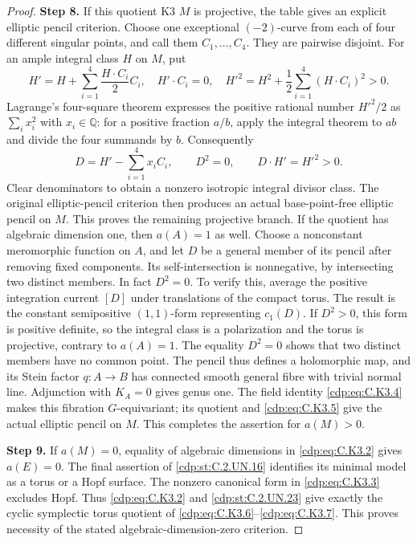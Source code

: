 \begin{proof}
\noindent\textbf{Step 8.} If this quotient K3 $M$ is projective, the table gives
an explicit elliptic pencil criterion. Choose one
exceptional $(-2)$-curve from each of four different
singular points, and call them $C_1,\ldots,C_4$.
They are pairwise disjoint. For an ample integral
class $H$ on $M$, put
\[
 H'=H+\sum_{i=1}^4\frac{H\cdot C_i}{2}C_i,
 \quad H'\cdot C_i=0,
 \quad H'^2=H^2+\frac12\sum_{i=1}^4(H\cdot C_i)^2>0.
                                                               \tag{C.K3.8}\label{cdp:eq:C.K3.8}
\]
Lagrange's four-square theorem
\cite[Theorem~II, Corollary~II]{Lagrange1770}
expresses the positive rational number $H'^2/2$ as
$\sum_i x_i^2$ with $x_i\in\mathbb Q$: for a
positive fraction $a/b$, apply the integral theorem
to $ab$ and divide the four summands by $b$.
Consequently
\[
 D=H'-\sum_{i=1}^4x_iC_i,
 \qquad D^2=0,
 \qquad D\cdot H'=H'^2>0.
                                                               \tag{C.K3.9}\label{cdp:eq:C.K3.9}
\]
Clear denominators to obtain a nonzero isotropic
integral divisor class. The original elliptic-pencil
criterion \cite[\S3, Corollary~3, with the reflection
argument of \S6]{PiatetskiShapiroShafarevich1971}
then produces an actual base-point-free elliptic
pencil on $M$. This proves the remaining projective
branch. If the quotient has algebraic dimension
one, then $a(A)=1$ as well. Choose a nonconstant
meromorphic function on $A$, and let $D$ be a
general member of its pencil after removing fixed
components. Its self-intersection is nonnegative,
by intersecting two distinct members. In fact
$D^2=0$. To verify this, average the positive
integration current $[D]$ under translations of
the compact torus. The result is the constant
semipositive $(1,1)$-form representing $c_1(D)$.
If $D^2>0$, this form is positive definite, so
the integral class is a polarization and the
torus is projective, contrary to $a(A)=1$.
The equality $D^2=0$ shows that two distinct
members have no common point. The pencil thus
defines a holomorphic map, and its Stein factor
$q:A\to B$ has connected smooth general fibre
with trivial normal line. Adjunction with
$K_A=0$ gives genus one. The field identity
\eqref{cdp:eq:C.K3.4} makes this fibration $G$-equivariant;
its quotient and \eqref{cdp:eq:C.K3.5} give the actual
elliptic pencil on $M$. This completes the
assertion for $a(M)>0$.

\noindent\textbf{Step 9.} If $a(M)=0$, equality of algebraic dimensions in
\eqref{cdp:eq:C.K3.2} gives $a(E)=0$. The final assertion of
\ref{cdp:st:C.2.UN.16} identifies its minimal model as a torus
or a Hopf surface. The nonzero canonical form
in \eqref{cdp:eq:C.K3.3} excludes Hopf. Thus \eqref{cdp:eq:C.K3.2} and
\ref{cdp:st:C.2.UN.23} give exactly the cyclic symplectic torus
quotient of \eqref{cdp:eq:C.K3.6}--\eqref{cdp:eq:C.K3.7}. This proves necessity
of the stated algebraic-dimension-zero criterion.


\end{proof}
